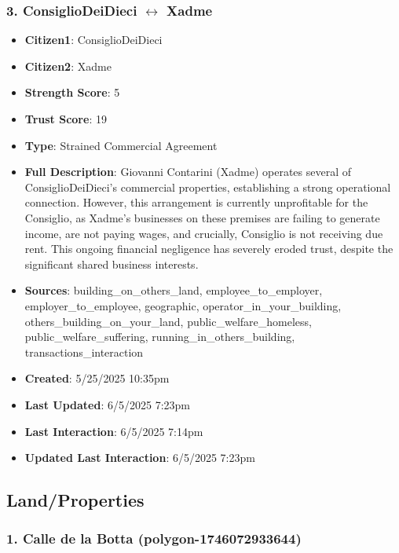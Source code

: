 \documentclass[11pt,a4paper]{article}
\begin{document}
\subsubsection{3. ConsiglioDeiDieci $\leftrightarrow$ Xadme}

\begin{itemize}
\item \textbf{Citizen1}: ConsiglioDeiDieci
\item \textbf{Citizen2}: Xadme
\item \textbf{Strength Score}: 5
\item \textbf{Trust Score}: 19
\item \textbf{Type}: Strained Commercial Agreement
\item \textbf{Full Description}: Giovanni Contarini (Xadme) operates several of ConsiglioDeiDieci's commercial properties, establishing a strong operational connection. However, this arrangement is currently unprofitable for the Consiglio, as Xadme's businesses on these premises are failing to generate income, are not paying wages, and crucially, Consiglio is not receiving due rent. This ongoing financial negligence has severely eroded trust, despite the significant shared business interests.
\item \textbf{Sources}: building\_on\_others\_land, employee\_to\_employer, employer\_to\_employee, geographic, operator\_in\_your\_building, others\_building\_on\_your\_land, public\_welfare\_homeless, public\_welfare\_suffering, running\_in\_others\_building, transactions\_interaction
\item \textbf{Created}: 5/25/2025 10:35pm
\item \textbf{Last Updated}: 6/5/2025 7:23pm
\item \textbf{Last Interaction}: 6/5/2025 7:14pm
\item \textbf{Updated Last Interaction}: 6/5/2025 7:23pm
\end{itemize}

\subsection{Land/Properties}

\subsubsection{1. Calle de la Botta (polygon-1746072933644)}
\end{document}
